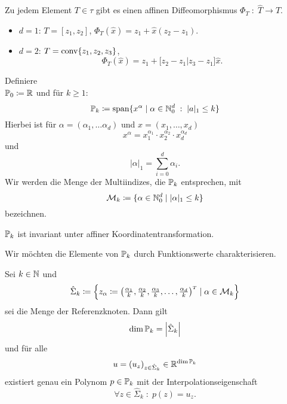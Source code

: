 \documentclass[../skript.tex]{subfiles}
\begin{document}
\begin{remark} %
\label{def:c2e3s3}
Zu jedem Element $T \in \tau$ gibt es einen affinen Diffeomorphismus $\Phi_T \; : \; \hat{T} \to T$.
\begin{itemize}
\item $d = 1$: $T = [z_1, z_2]$, $\Phi_T(\hat{x}) = z_1 + \hat{x} (z_2 - z_1)$.
\item $d = 2$: $T = \operatorname{conv} \{ z_1, z_2, z_3\}$, 
\[
	\Phi_T(\hat{x}) = z_1 + \Bigg[ z_2 - z_1 \Bigg| z_3 - z_1 \Bigg] \hat{x}.
\]
\end{itemize}
\end{remark}
\begin{definition} %
\label{def:c2e3s4}
Definiere \\ $\mathbb{P}_0 \coloneqq \mathbb{R}$ und für $k \geq 1$:
\[
	\mathbb{P}_k \coloneqq \operatorname*{span} \{ x^\alpha \mid \alpha \in \mathbb{N}_0^d \; : \; |a|_1 \leq k \}
\]
Hierbei ist für $\alpha = (\alpha_1, \ldots \alpha_d)$ und $x = (x_1, \ldots, x_d)$
\[
	x^\alpha = x_1^{\alpha_1} \cdot x_2^{\alpha_2} \cdot x_d^{\alpha_d}
\]
und
\[
	|\alpha|_1 = \sum_{i = 0}^d \alpha_i.
\]
Wir werden die Menge der Multiindizes, die $\mathbb{P}_k$ entsprechen, mit
\[
	\mathcal{M}_k \coloneqq \{ \alpha \in \mathbb{N}_0^d \mid |\alpha|_1 \leq k\}
\]
bezeichnen.
\end{definition}
\begin{remark} %
\label{bem:c2e3s5}
$\mathbb{P}_k$ ist invariant unter affiner Koordinatentransformation.
\end{remark}
Wir möchten die Elemente von $\mathbb{P}_k$ durch Funktionswerte charakterisieren.
\begin{theorem} %
\label{thm:c2e3s6}
Sei $k \in \mathbb{N}$ und
\[
\hat{\Sigma}_k \coloneqq \left\{ z_\alpha \coloneqq \begin{pmatrix}
\frac{\alpha_1}{k}, \frac{\alpha_2}{k}, \frac{\alpha_3}{k}, \ldots, \frac{\alpha_d}{k}
\end{pmatrix}^\tp \mid \alpha \in \mathcal{M}_k \right\}
\]
sei die Menge der Referenzknoten.
Dann gilt
\[
\dim \mathbb{P}_k = \left|\hat{\Sigma}_k\right|
\]
und für alle
\[
	u = (u_z)_{z \in \hat{\Sigma}_k} \in \mathbb{R}^{\dim \mathbb{P}_k}
\]
existiert genau ein Polynom $p \in \mathbb{P}_k$ mit der Interpolationseigenschaft
\[
	\forall z \in \hat{\Sigma}_k \; : \; p(z) = u_z.
\]
\end{theorem}
\end{document}
